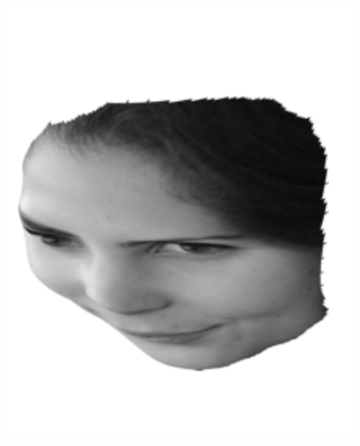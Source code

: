 \begin{figure}
\begin{subfigure}{0.23\textwidth}
        \includegraphics[width=\textwidth]{statistical_normals/images/sirfs_borrowed/sirfs_depth1}
\label{subfig:sirfs-1-depth}
    \end{subfigure}
    \\
    \begin{subfigure}{0.23\textwidth}
        \centering

\end{subfigure}
\end{figure}
